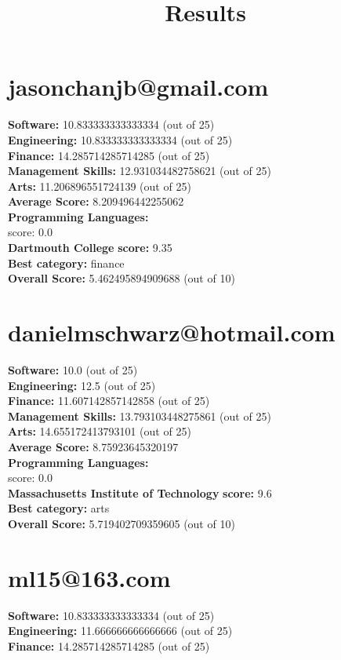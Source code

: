\documentclass{article}
\title{Results}
\begin{document}
\section{jasonchanjb@gmail.com}
\textbf{Software:} 10.833333333333334 (out of 25)\\
\textbf{Engineering: } 10.833333333333334 (out of 25)\\
\textbf{Finance:} 14.285714285714285 (out of 25)\\
\textbf{Management Skills:} 12.931034482758621 (out of 25)\\
\textbf{Arts:} 11.206896551724139 (out of 25)\\
\textbf{Average Score: } 8.209496442255062\\
\textbf{Programming Languages:} \\
score: 0.0\\
\textbf{Dartmouth College} \textbf{score:} 9.35\\
\textbf{Best category: } finance\\
\textbf{Overall Score: }5.462495894909688 (out of 10)\section{danielmschwarz@hotmail.com}
\textbf{Software:} 10.0 (out of 25)\\
\textbf{Engineering: } 12.5 (out of 25)\\
\textbf{Finance:} 11.607142857142858 (out of 25)\\
\textbf{Management Skills:} 13.793103448275861 (out of 25)\\
\textbf{Arts:} 14.655172413793101 (out of 25)\\
\textbf{Average Score: } 8.75923645320197\\
\textbf{Programming Languages:} \\
score: 0.0\\
\textbf{Massachusetts Institute of Technology} \textbf{score:} 9.6\\
\textbf{Best category: } arts\\
\textbf{Overall Score: }5.719402709359605 (out of 10)\section{ml15@163.com}
\textbf{Software:} 10.833333333333334 (out of 25)\\
\textbf{Engineering: } 11.666666666666666 (out of 25)\\
\textbf{Finance:} 14.285714285714285 (out of 25)\\
\end{document}
